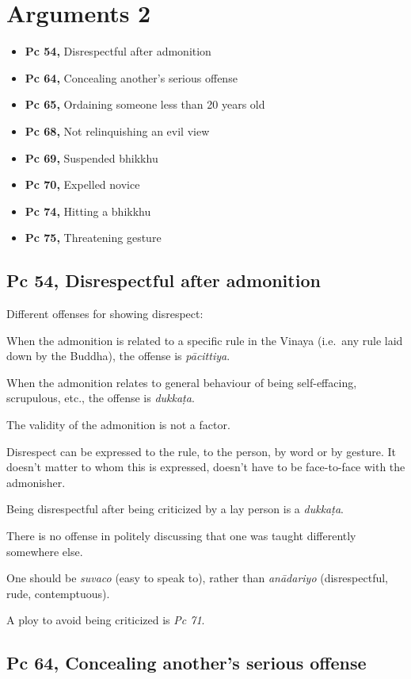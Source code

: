 \chapter{Arguments 2}

\begin{itemize}
\tightlist
\item
  \textbf{Pc 54,} Disrespectful after admonition
\item
  \textbf{Pc 64,} Concealing another's serious offense
\item
  \textbf{Pc 65,} Ordaining someone less than 20 years old
\item
  \textbf{Pc 68,} Not relinquishing an evil view
\item
  \textbf{Pc 69,} Suspended bhikkhu
\item
  \textbf{Pc 70,} Expelled novice
\item
  \textbf{Pc 74,} Hitting a bhikkhu
\item
  \textbf{Pc 75,} Threatening gesture
\end{itemize}

\section{Pc 54, Disrespectful after admonition}

Different offenses for showing disrespect:

When the admonition is related to a specific rule in the Vinaya
(i.e.~any rule laid down by the Buddha), the offense is
\emph{pācittiya}.

When the admonition relates to general behaviour of being self-effacing,
scrupulous, etc., the offense is \emph{dukkaṭa}.

The validity of the admonition is not a factor.

Disrespect can be expressed to the rule, to the person, by word or by
gesture. It doesn't matter to whom this is expressed, doesn't have to be
face-to-face with the admonisher.

Being disrespectful after being criticized by a lay person is a
\emph{dukkaṭa}.

There is no offense in politely discussing that one was taught
differently somewhere else.

One should be \emph{suvaco} (easy to speak to), rather than
\emph{anādariyo} (disrespectful, rude, contemptuous).

A ploy to avoid being criticized is \emph{Pc 71}.

\section{Pc 64, Concealing another's serious offense}

